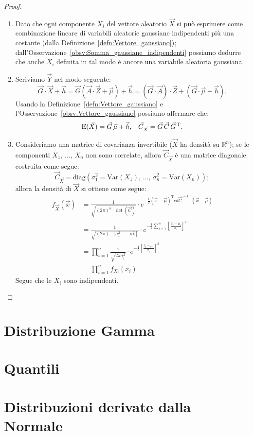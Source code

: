         \begin{proof}
            \hfill
            \begin{enumerate}
                \item Dato che ogni componente $X_i$ del vettore aleatorio $\vec{X}$ si può esprimere come 
                    combinazione lineare di variabili aleatorie gaussiane indipendenti più una 
                    costante (dalla Definizione~\ref{defn:Vettore_gaussiano}); 
                    dall'Osservazione~\ref{obsv:Somma_gaussiane_indipendenti} possiamo dedurre che anche $X_i$ 
                    definita in tal modo è ancore una variabile aleatoria gaussiana.
                \item Scriviamo $\vec{Y}$ nel modo seguente: \[
                        \vec{G} \cdot \vec{X} + \vec{h} = \vec{G}(\vec{A} \cdot \vec{Z} + \vec{\mu}) + \vec{h}
                        = (\vec{G} \cdot \vec{A})\cdot \vec{Z} + (\vec{G} \cdot \vec{\mu} + \vec{h})
                    .\] Usando la Definizione~\ref{defn:Vettore_gaussiano} e 
                    l'Osservazione~\ref{obsv:Vettore_gaussiano} possiamo affermare che:
                    \begin{align*}
                        \text{E}(\vec{X}) = \vec{G}\, \vec{\mu} + \vec{h}, & &
                        \vec{C}_{\vec{X}} = \vec{G}\, \vec{C}\, \vec{G}^{\text{\,T}}
                    .\end{align*}
                \item Consideriamo una matrice di covarianza invertibile ($\vec{X}$ ha densità su 
                    $\mathbb{R}^n$); se le componenti $X_1,\, \ldots,\, X_{n}$ non sono correlate, allora 
                    $\vec{C}_{\vec{X}}$ è una matrice diagonale costruita come segue: \[
                        \vec{C}_{\vec{X}} = \text{diag}\left(\sigma_1^2 = \text{Var}(X_1),\, 
                        \ldots,\, \sigma_n^2 = \text{Var}(X_n)\right)
                    ;\] allora la densità di $\vec{X}$ si ottiene come segue:
                    \begin{align*}
                        f_{\vec{X}}(\vec{x}) &= \frac{1}{\sqrt{(2\pi)^n \cdot \det(\vec{C})}} \cdot e^{-\frac{1}{2}(\vec{x}-\vec{\mu})^{\text{T}}cd \vec{C}^{\,-1}\cdot(\vec{x}-\vec{\mu})} \\
                        &= \frac{1}{\sqrt{(2\pi)\cdot [\sigma_1^2\cdot \ldots\cdot \sigma_n^2]}} \cdot e^{-\frac{1}{2} \sum_{i=1}^{n} \left[\frac{x_i-\mu_i}{\sigma_i}\right]^2} \\
                        &= \prod_{i=1}^{n} \frac{1}{\sqrt{2\pi \sigma_i^2}} \cdot e^{-\frac{1}{2}\left[\frac{x_i-\mu_i}{\sigma_i}\right]^2} \\
                        &= \prod_{i=1}^{n} f_{X_i}(x_i)
                    .\end{align*}
                    Segue che le $X_i$ sono indipendenti. \qedhere
            \end{enumerate}
        \end{proof}
    \section{Distribuzione Gamma}
    \section{Quantili}
    \section{Distribuzioni derivate dalla Normale}
